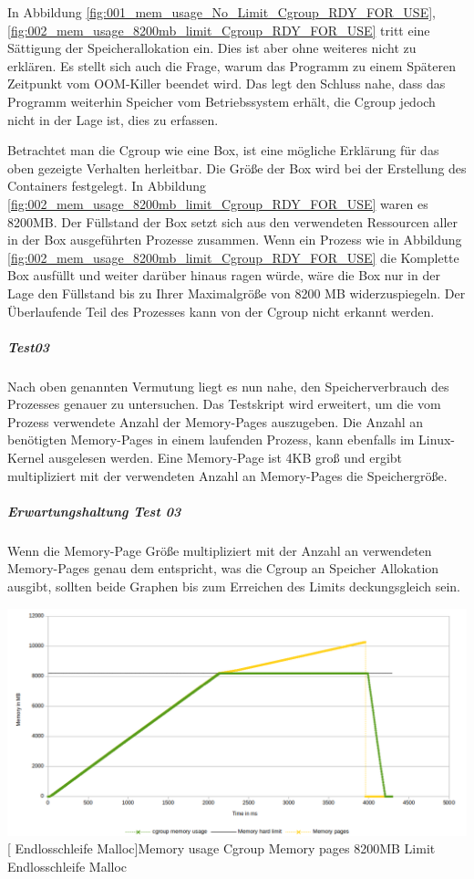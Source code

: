 In Abbildung \ref{fig:001_mem_usage_No_Limit_Cgroup_RDY_FOR_USE}, \ref{fig:002_mem_usage_8200mb_limit_Cgroup_RDY_FOR_USE} tritt eine Sättigung der Speicherallokation ein.  Dies ist aber ohne weiteres nicht zu erklären. Es stellt sich auch die Frage, warum das Programm zu einem Späteren Zeitpunkt vom OOM-Killer beendet wird. Das legt den Schluss nahe, dass das Programm weiterhin Speicher vom Betriebssystem erhält, die Cgroup jedoch nicht in der Lage ist, dies zu erfassen. 

Betrachtet man die Cgroup wie eine Box, ist eine mögliche Erklärung für das oben gezeigte Verhalten herleitbar. Die Größe der Box wird bei der Erstellung des Containers festgelegt. In Abbildung \ref{fig:002_mem_usage_8200mb_limit_Cgroup_RDY_FOR_USE} waren es 8200MB. Der Füllstand der Box setzt sich aus den verwendeten Ressourcen aller in der Box ausgeführten Prozesse zusammen. Wenn ein Prozess wie in Abbildung \ref{fig:002_mem_usage_8200mb_limit_Cgroup_RDY_FOR_USE} die Komplette Box ausfüllt und weiter darüber hinaus ragen würde, wäre die Box nur in der Lage den Füllstand bis zu Ihrer Maximalgröße von 8200 MB widerzuspiegeln. Der Überlaufende Teil des Prozesses kann von der Cgroup nicht erkannt werden.

\subparagraph{Test03}
Nach oben genannten Vermutung liegt es nun nahe, den Speicherverbrauch des Prozesses genauer zu untersuchen. Das Testskript wird erweitert, um die vom Prozess verwendete Anzahl der Memory-Pages auszugeben. Die Anzahl an benötigten Memory-Pages in einem laufenden Prozess, kann ebenfalls im Linux-Kernel ausgelesen werden. Eine Memory-Page ist 4KB groß und ergibt multipliziert mit der verwendeten Anzahl an Memory-Pages die Speichergröße.

\subparagraph{Erwartungshaltung Test 03}
Wenn die Memory-Page Größe multipliziert mit der Anzahl an verwendeten Memory-Pages genau dem entspricht, was die Cgroup an Speicher Allokation ausgibt, sollten beide Graphen bis zum Erreichen des Limits deckungsgleich sein.

\vspace{1em}
\begin{minipage}{\linewidth}
	\centering
	\includegraphics[width=1\linewidth]{pics/003_mem_usage_8200mb_limit_Cgroup_Pages_RDY_FOR_USE.png}
	[ Endlosschleife Malloc]{Memory usage Cgroup Memory pages 8200MB Limit Endlosschleife Malloc}
	\label{fig:003_mem_usage_8200mb_limit_Cgroup_Pages_RDY_FOR_USE}
\end{minipage}

